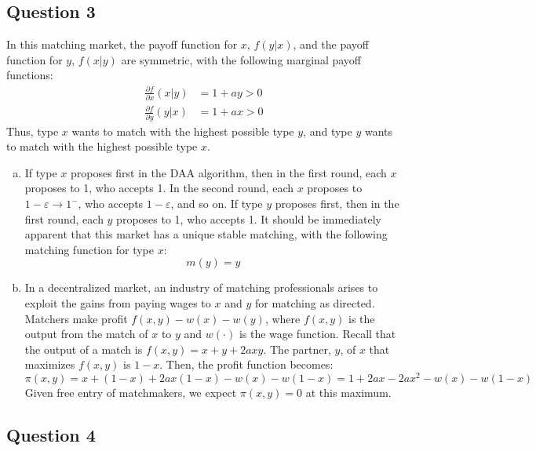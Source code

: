 \documentclass{article}
\begin{document}

\subsection*{Question 3}
In this matching market, the payoff function for $x$, $f(y|x)$, and the payoff function for $y$, $f(x|y)$ are symmetric, with the following marginal payoff functions:
\begin{align*}
	\frac{\partial f}{\partial x}(x|y)	&= 1 + ay	>	0	\\
	\frac{\partial f}{\partial y}(y|x)	&= 1 + ax	>	0
\end{align*}
Thus, type $x$ wants to match with the highest possible type $y$, and type $y$ wants to match with the highest possible type $x$.
\begin{enumerate}[(a)]
	\item If type $x$ proposes first in the DAA algorithm, then in the first round, each $x$ proposes to 1, who accepts 1. In the second round, each $x$ proposes to ${1-\varepsilon\rightarrow 1^-}$, who accepts ${1-\varepsilon}$, and so on. If type $y$ proposes first, then in the first round, each $y$ proposes to 1, who accepts 1. It should be immediately apparent that this market has a unique stable matching, with the following matching function for type $x$:
		\[
			m(y) = y
		\]
	
	\item In a decentralized market, an industry of matching professionals arises to exploit the gains from paying wages to $x$ and $y$ for matching as directed. Matchers make profit ${f(x,y)-w(x)-w(y)}$, where $f(x,y)$ is the output from the match of $x$ to $y$ and $w(\cdot)$ is the wage function. Recall that the output of a match is ${f(x,y)=x+y+2axy}$. The partner, $y$, of $x$ that maximizes $f(x,y)$ is $1-x$. Then, the profit function becomes:
		\[
			\pi(x,y) = x + (1-x) + 2ax(1-x) - w(x) - w(1-x) = 1 + 2ax - 2ax^2 - w(x) - w(1-x) 
		\]
	 Given free entry of matchmakers, we expect $\pi(x,y)=0$ at this maximum.
\end{enumerate}



\subsection*{Question 4}



\end{document}

